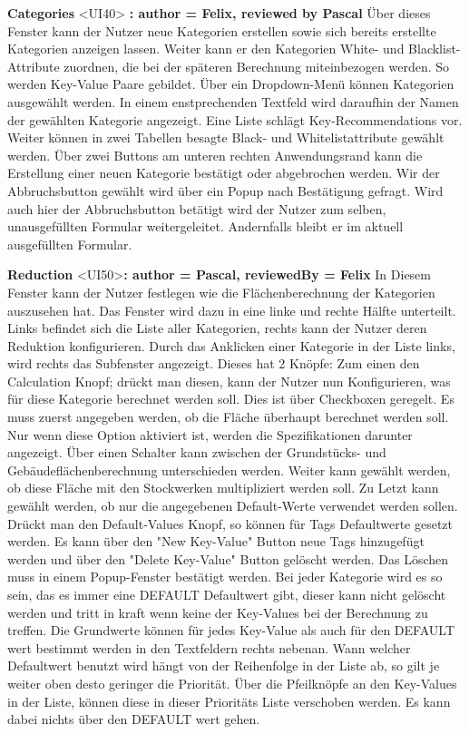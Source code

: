 \documentclass[parskip=full]{scrartcl} %
\begin{document}
\textbf{Categories }<UI40>\textbf{ : author = Felix, reviewed by Pascal}
Über dieses Fenster kann der Nutzer neue Kategorien erstellen sowie sich bereits erstellte Kategorien anzeigen lassen. Weiter kann er den Kategorien White- und Blacklist-Attribute zuordnen, die bei der späteren Berechnung miteinbezogen werden. So werden Key-Value Paare gebildet.
Über ein Dropdown-Menü können Kategorien ausgewählt werden. In einem enstprechenden Textfeld wird daraufhin der Namen der gewählten Kategorie angezeigt. Eine Liste schlägt Key-Recommendations vor. Weiter können in zwei Tabellen besagte Black- und Whitelistattribute gewählt werden.
Über zwei Buttons am unteren rechten Anwendungsrand kann die Erstellung einer neuen Kategorie bestätigt oder abgebrochen werden. 
Wir der Abbruchsbutton gewählt wird über ein Popup nach Bestätigung gefragt. Wird auch hier der Abbruchsbutton betätigt wird der Nutzer zum selben, unausgefüllten Formular weitergeleitet. Andernfalls bleibt er im aktuell ausgefüllten Formular.

\textbf{Reduction }<UI50>\textbf{: author = Pascal, reviewedBy = Felix}
In Diesem Fenster kann der Nutzer festlegen wie die Flächenberechnung der Kategorien auszusehen hat. Das Fenster wird dazu in eine linke und rechte Hälfte unterteilt.
Links befindet sich die Liste aller Kategorien, rechts kann der Nutzer deren Reduktion konfigurieren.
Durch das Anklicken einer Kategorie in der Liste links, wird rechts das Subfenster angezeigt. Dieses hat 2 Knöpfe: Zum einen den Calculation Knopf; drückt man diesen, kann der Nutzer nun Konfigurieren, was für diese Kategorie berechnet werden soll. Dies ist über Checkboxen geregelt. Es muss zuerst angegeben werden, ob die Fläche überhaupt berechnet werden soll. Nur wenn diese Option aktiviert ist, werden die Spezifikationen darunter angezeigt. Über einen Schalter kann zwischen der Grundstücks- und Gebäudeflächenberechnung unterschieden werden. Weiter kann gewählt werden, ob diese Fläche mit den Stockwerken multipliziert werden soll. Zu Letzt kann gewählt werden, ob nur die angegebenen Default-Werte verwendet werden sollen.
Drückt man den Default-Values Knopf, so können für Tags Defaultwerte gesetzt werden. Es kann über den "New Key-Value" Button neue Tags hinzugefügt werden und über den "Delete Key-Value" Button gelöscht werden. Das Löschen muss in einem Popup-Fenster bestätigt werden.
Bei jeder Kategorie wird es so sein, das es immer eine DEFAULT Defaultwert gibt, dieser kann nicht gelöscht werden und tritt in kraft wenn keine der Key-Values bei der Berechnung zu treffen.
Die Grundwerte können für jedes Key-Value als auch für den DEFAULT wert bestimmt werden in den Textfeldern rechts nebenan.
Wann welcher Defaultwert benutzt wird hängt von der Reihenfolge in der Liste ab, so gilt je weiter oben desto geringer die Priorität. Über die Pfeilknöpfe an den Key-Values in der Liste, können diese in dieser Prioritäts Liste verschoben werden. Es kann dabei nichts über den DEFAULT wert gehen.
\end{document}

